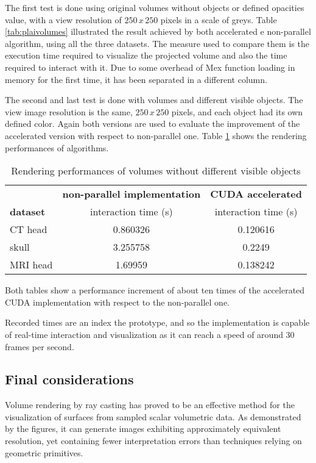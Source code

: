 \documentclass[12pt,a4paper]{extarticle}
\newcommand{\linespace}{\vspace{8pt}}
\begin{document}
The first test is done using original volumes without objects or defined opacities value, with a view resolution of $250\,x\,250$ pixels in a scale of greys. Table \ref{tab:plaivolumes} illustrated the result achieved by both accelerated e non-parallel algorithm, using all the three datasets. The measure used to compare them is the execution time required to visualize the projected volume and also the time required to interact with it. Due to some overhead of Mex function loading in memory for the first time, it has been separated in a different column.
\linespace

The second and last test is done with volumes and different visible objects. The view image resolution is the same, $250\,x\,250$ pixels, and each object had its own defined color. Again both versions are used to evaluate the improvement of the accelerated version with respect to non-parallel one.
Table \ref{tab:objsvolumes} shows the rendering performances of algorithms.

\begin{table}[hbtp]
\centering
\begin{tabular}{l|cc}
                 & \multicolumn{1}{c|}{\textbf{non-parallel implementation}} & \textbf{CUDA accelerated} \\ \cline{2-3} 
\textbf{dataset} & \multicolumn{1}{c|}{interaction time (s)}                 & interaction time (s)      \\ \hline
CT head          & 0.860326                                                  & 0.120616                  \\
skull            & 3.255758                                                  & 0.2249                    \\
MRI head         & 1.69959                                                   & 0.138242                 
\end{tabular}
\caption{Rendering performances of volumes without different visible objects}
\label{tab:objsvolumes}
\end{table}

Both tables show a performance increment of about ten times of the accelerated CUDA implementation with respect to the non-parallel one.

Recorded times are an index the prototype, and so the implementation is capable of real-time interaction and visualization as it can reach a speed of around 30 frames per second.

\subsection{Final considerations} 
Volume rendering by ray casting has proved to be an effective method for the visualization of surfaces from sampled scalar volumetric data. As demonstrated by the figures, it can generate images exhibiting approximately equivalent resolution, yet containing fewer interpretation errors than techniques relying on geometric primitives.
\linespace
\end{document}
